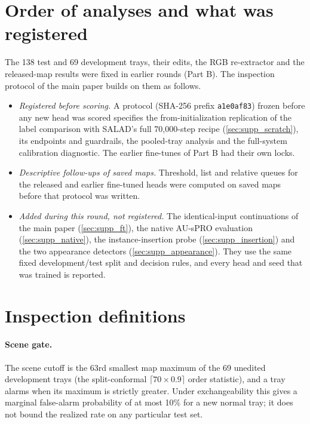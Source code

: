 \section{Order of analyses and what was registered}
\label{sec:supp_order}
The 138 test and 69 development trays, their edits, the RGB re-extractor and the released-map results were fixed in earlier rounds (Part B). The inspection protocol of the main paper builds on them as follows.
\begin{itemize}\setlength\itemsep{1pt}
\item \emph{Registered before scoring.} A protocol (SHA-256 prefix \texttt{a1e0af83}) frozen before any new head was scored specifies the from-initialization replication of the label comparison with SALAD's full 70{,}000-step recipe (\cref{sec:supp_scratch}), its endpoints and guardrails, the pooled-tray analysis and the full-system calibration diagnostic. The earlier fine-tunes of Part B had their own locks.
\item \emph{Descriptive follow-ups of saved maps.} Threshold, list and relative queues for the released and earlier fine-tuned heads were computed on saved maps before that protocol was written.
\item \emph{Added during this round, not registered.} The identical-input continuations of the main paper (\cref{sec:supp_ft}), the native AU-sPRO evaluation (\cref{sec:supp_native}), the instance-insertion probe (\cref{sec:supp_insertion}) and the two appearance detectors (\cref{sec:supp_appearance}). They use the same fixed development/test split and decision rules, and every head and seed that was trained is reported.
\end{itemize}

\section{Inspection definitions}
\label{sec:supp_defs}
\paragraph{Scene gate.} The scene cutoff is the 63rd smallest map maximum of the 69 unedited development trays (the split-conformal $\lceil 70\times0.9\rceil$ order statistic), and a tray alarms when its maximum is strictly greater. Under exchangeability this gives a marginal false-alarm probability of at most 10\% for a new normal tray; it does not bound the realized rate on any particular test set.

